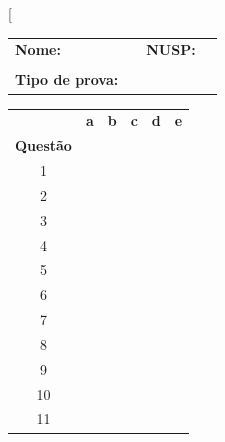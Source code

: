 \documentclass[twocolumn,landscape]{amsart}
\begin{document}
\thispagestyle{empty}
\twocolumn[\begin{@twocolumnfalse}
  \bigskip

  \begin{tabular}{llll}
    {\bf Nome:}&\underline{\hspace{15cm}}&{\bf NUSP:}&\underline{\hspace{5cm}}\\
    &&&\\
    {\bf Tipo de prova:}&\underline{\hspace{3cm}}&&\\
  \end{tabular}

  \vspace{1cm}

\begin{center}
  \begin{tabular}{cccccc}
    &{\bf a}&{\bf b}&{\bf c}&{\bf d}&{\bf e}\\
    {\bf Questão}&&&&&\\
    1&\fbox{\phantom{M}}&\fbox{\phantom{M}}&\fbox{\phantom{M}}&\fbox{\phantom{M}}&\fbox{\phantom{M}}\\
    2&\fbox{\phantom{M}}&\fbox{\phantom{M}}&\fbox{\phantom{M}}&\fbox{\phantom{M}}&\fbox{\phantom{M}}\\
    3&\fbox{\phantom{M}}&\fbox{\phantom{M}}&\fbox{\phantom{M}}&\fbox{\phantom{M}}&\fbox{\phantom{M}}\\
    4&\fbox{\phantom{M}}&\fbox{\phantom{M}}&\fbox{\phantom{M}}&\fbox{\phantom{M}}&\fbox{\phantom{M}}\\
    5&\fbox{\phantom{M}}&\fbox{\phantom{M}}&\fbox{\phantom{M}}&\fbox{\phantom{M}}&\fbox{\phantom{M}}\\
    6&\fbox{\phantom{M}}&\fbox{\phantom{M}}&\fbox{\phantom{M}}&\fbox{\phantom{M}}&\fbox{\phantom{M}}\\
    7&\fbox{\phantom{M}}&\fbox{\phantom{M}}&\fbox{\phantom{M}}&\fbox{\phantom{M}}&\fbox{\phantom{M}}\\
    8&\fbox{\phantom{M}}&\fbox{\phantom{M}}&\fbox{\phantom{M}}&\fbox{\phantom{M}}&\fbox{\phantom{M}}\\
    9&\fbox{\phantom{M}}&\fbox{\phantom{M}}&\fbox{\phantom{M}}&\fbox{\phantom{M}}&\fbox{\phantom{M}}\\
    10&\fbox{\phantom{M}}&\fbox{\phantom{M}}&\fbox{\phantom{M}}&\fbox{\phantom{M}}&\fbox{\phantom{M}}\\
    11&\fbox{\phantom{M}}&\fbox{\phantom{M}}&\fbox{\phantom{M}}&\fbox{\phantom{M}}&\fbox{\phantom{M}}\\

\end{tabular}
\end{center}
\end{@twocolumnfalse}
\end{document}
